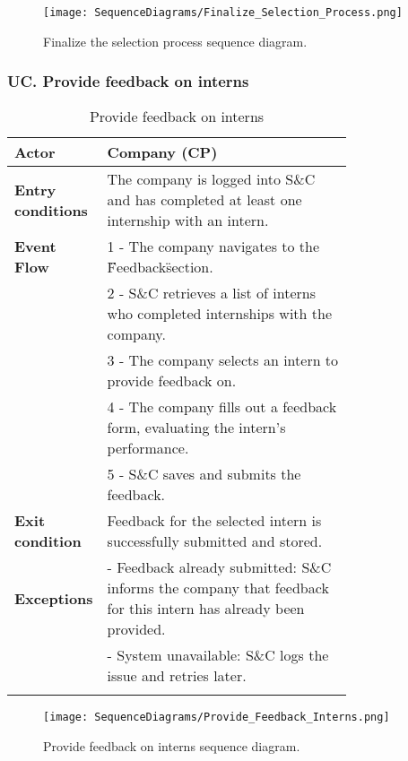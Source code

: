\begin{figure}[H]
    \begin{center}
        \texttt{[image: SequenceDiagrams/Finalize\_Selection\_Process.png]}
        \caption{Finalize the selection process sequence diagram.}
        \label{fig:finalize_the_selection_process_seqd}%
    \end{center}
\end{figure}

\subsubsection*{UC\cuc . Provide feedback on interns}
\begin{center}
    \begin{longtable}{|l|p{0.75\linewidth}|}
        \hline
        \textbf{Actor}            & Company (CP) \\
        \hline
        \textbf{Entry conditions} & The company is logged into S\&C and has completed at least one internship with an intern. \\
        \hline
        \textbf{Event Flow}       & 1 - The company navigates to the \"Feedback\" section. \\
        & 2 - S\&C retrieves a list of interns who completed internships with the company. \\
        & 3 - The company selects an intern to provide feedback on. \\
        & 4 - The company fills out a feedback form, evaluating the intern's performance. \\
        & 5 - S\&C saves and submits the feedback. \\
        \hline
        \textbf{Exit condition}   & Feedback for the selected intern is successfully submitted and stored. \\       
        \hline
        \textbf{Exceptions}       & - Feedback already submitted: S\&C informs the company that feedback for this intern has already been provided. \\
                                  & - System unavailable: S\&C logs the issue and retries later. \\
        \hline
        \caption{Provide feedback on interns}
        \label{tab:provide_feedback_interns_usecase}
    \end{longtable}
\end{center}

\begin{figure}[H]
    \begin{center}
        \texttt{[image: SequenceDiagrams/Provide\_Feedback\_Interns.png]}
        \caption{Provide feedback on interns sequence diagram.}
        \label{fig:provide_feedback_interns_seqd}%
    \end{center}
\end{figure}

